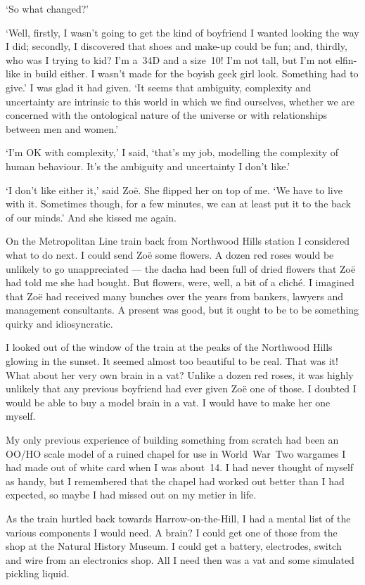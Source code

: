 `So what changed?'

`Well, firstly, I wasn't going to get the kind of boyfriend I wanted
looking the way I did; secondly, I discovered that shoes and make-up
could be fun; and, thirdly, who was I trying to kid? I'm a~34D and a
size~10! I'm not tall, but I'm not elfin-like in build either. I
wasn't made for the boyish geek girl look. Something had to give.' I
was glad it had given. `It seems that ambiguity, complexity and
uncertainty are intrinsic to this world in which we find ourselves,
whether we are concerned with the ontological nature of the universe
or with relationships between men and women.'

`I'm OK with complexity,' I said, `that's my job, modelling the
complexity of human behaviour. It's the ambiguity and uncertainty I
don't like.'

`I don't like either it,' said Zoë. She flipped her on top of
me. `We have to live with it. Sometimes though, for a few minutes,
we can at least put it to the back of our minds.' And she kissed me
again.

On the Metropolitan Line train back from Northwood Hills station I
considered what to do next. I could send Zoë some flowers. A
dozen red roses would be unlikely to go unappreciated --- the dacha
had been full of dried flowers that Zoë had told me she had
bought. But flowers, were, well, a bit of a cliché. I imagined
that Zoë had received many bunches over the years from bankers,
lawyers and management consultants. A present was good, but it ought
to be to be something quirky and idiosyncratic.

I looked out of the window of the train at the peaks of the
Northwood Hills glowing in the sunset. It seemed almost too
beautiful to be real. That was it! What about her very own brain in
a vat? Unlike a dozen red roses, it was highly unlikely that any
previous boyfriend had ever given Zoë one of those. I doubted I
would be able to buy a model brain in a vat. I would have to make
her one myself.

My only previous experience of building something from scratch had
been an OO/HO scale model of a ruined chapel for use in
World~War~Two wargames I had made out of white card when I was
about~14. I had never thought of myself as handy, but I remembered
that the chapel had worked out better than I had expected, so maybe
I had missed out on my metier in life.

As the train hurtled back towards Harrow-on-the-Hill, I had a mental
list of the various components I would need. A brain? I could get one of
those from the shop at the Natural History Museum. I could get a
battery, electrodes, switch and wire from an electronics shop. All I
need then was a vat and some simulated pickling liquid.

